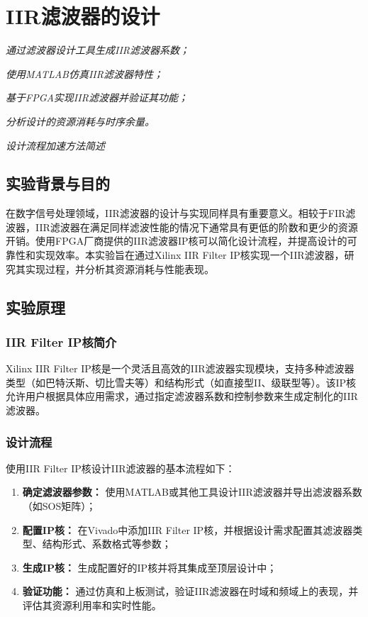 \chapter{IIR滤波器的设计}
\begin{introduction}
    \item \textit{通过滤波器设计工具生成IIR滤波器系数；}
    \item \textit{使用MATLAB仿真IIR滤波器特性；}
    \item \textit{基于FPGA实现IIR滤波器并验证其功能；}
    \item \textit{分析设计的资源消耗与时序余量。}
    \item \textit{设计流程加速方法简述}
\end{introduction}

\section{实验背景与目的}
在数字信号处理领域，IIR滤波器的设计与实现同样具有重要意义。相较于FIR滤波器，IIR滤波器在满足同样滤波性能的情况下通常具有更低的阶数和更少的资源开销。使用FPGA厂商提供的IIR滤波器IP核可以简化设计流程，并提高设计的可靠性和实现效率。本实验旨在通过Xilinx IIR Filter IP核实现一个IIR滤波器，研究其实现过程，并分析其资源消耗与性能表现。

\section{实验原理}
\subsection{IIR Filter IP核简介}
Xilinx IIR Filter IP核是一个灵活且高效的IIR滤波器实现模块，支持多种滤波器类型（如巴特沃斯、切比雪夫等）和结构形式（如直接型II、级联型等）。该IP核允许用户根据具体应用需求，通过指定滤波器系数和控制参数来生成定制化的IIR滤波器。

\subsection{设计流程}
使用IIR Filter IP核设计IIR滤波器的基本流程如下：
\begin{enumerate}
    \item \textbf{确定滤波器参数：} 使用MATLAB或其他工具设计IIR滤波器并导出滤波器系数（如SOS矩阵）； 
    \item \textbf{配置IP核：} 在Vivado中添加IIR Filter IP核，并根据设计需求配置其滤波器类型、结构形式、系数格式等参数；
    \item \textbf{生成IP核：} 生成配置好的IP核并将其集成至顶层设计中；
    \item \textbf{验证功能：} 通过仿真和上板测试，验证IIR滤波器在时域和频域上的表现，并评估其资源利用率和实时性能。
\end{enumerate}

